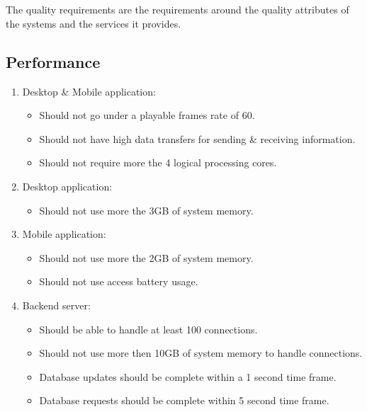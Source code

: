 \documentclass[letterpaper]{article}
\begin{document}
		\vspace{0.2in}
		\section*{\colorbox{black}{}} 
		\vspace{0.1in}
		
			The quality requirements are the requirements around the quality attributes of the systems and the
			services it provides.
			
			\subsection*{Performance}
			\vspace{0.1in}
			
			\begin{enumerate}
				\item Desktop \& Mobile application:
					\begin{itemize}
						\item Should not go under a playable frames rate of 60.
						\item Should not have high data transfers for sending \& receiving information.
						\item Should not require more the 4 logical processing cores.
					\end{itemize}
			
				\item Desktop application:
					\begin{itemize}
						\item Should not use more the 3GB of system memory.
					\end{itemize}
			
				\item Mobile application:
					\begin{itemize}
						\item Should not use more the 2GB of system memory.
						\item Should not use access battery usage.
					\end{itemize}
					
				\item Backend server:
					\begin{itemize}
						\item Should be able to handle at least 100 connections.
						\item Should not use more then 10GB of system memory to handle connections.
						\item Database updates should be complete within a 1 second time frame.
						\item Database requests should be complete within 5 second time frame.
					\end{itemize}
			\end{enumerate}
			
\end{document}
